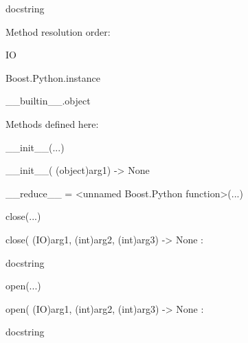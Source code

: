 \documentclass[letterpaper,10pt,english]{sphinxmanual}
\begin{document}
\begin{description}
\begin{description}
\item[{class IO(Boost.Python.instance)}] \leavevmode
\begin{DUlineblock}{0em}
\item[] docstring
\item[] 
\item[] Method resolution order:
\item[]
\begin{DUlineblock}{\DUlineblockindent}
\item[] IO
\item[] Boost.Python.instance
\item[] \_\_builtin\_\_.object
\item[] 
\end{DUlineblock}
\item[] Methods defined here:
\item[] 
\item[] \_\_init\_\_(...)
\item[]
\begin{DUlineblock}{\DUlineblockindent}
\item[] \_\_init\_\_( (object)arg1) -\textgreater{} None
\item[] 
\end{DUlineblock}
\item[] \_\_reduce\_\_ = \textless{}unnamed Boost.Python function\textgreater{}(...)
\item[] 
\item[] close(...)
\item[]
\begin{DUlineblock}{\DUlineblockindent}
\item[] close( (IO)arg1, (int)arg2, (int)arg3) -\textgreater{} None :
\item[]
\begin{DUlineblock}{\DUlineblockindent}
\item[] docstring
\item[] 
\end{DUlineblock}
\end{DUlineblock}
\item[] open(...)
\item[]
\begin{DUlineblock}{\DUlineblockindent}
\item[] open( (IO)arg1, (int)arg2, (int)arg3) -\textgreater{} None :
\item[]
\begin{DUlineblock}{\DUlineblockindent}
\item[] docstring
\item[] 

\end{DUlineblock}
\end{DUlineblock}
\end{DUlineblock}
\end{description}
\end{description}
\end{document}

